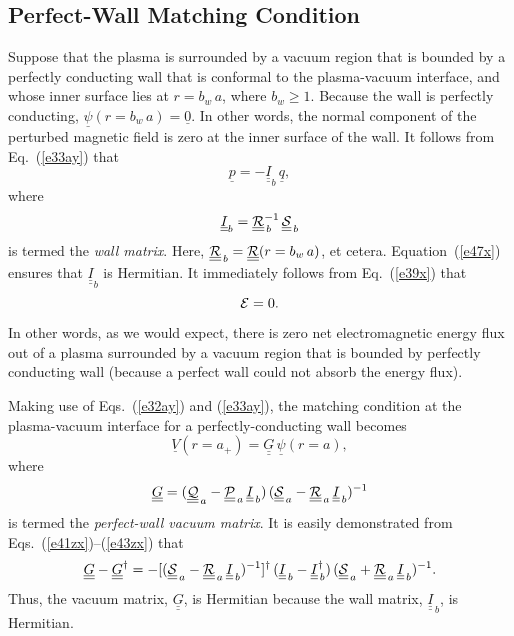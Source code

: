 \documentclass[12pt,prb,aps]{revtex4-1}
\begin{document}
\subsection{Perfect-Wall Matching Condition}
Suppose that the plasma is surrounded by a vacuum region that is bounded by a perfectly conducting wall that is conformal to the plasma-vacuum interface, and whose inner surface lies at $r=b_w\,a$, where $b_w\geq 1$. 
Because the wall is perfectly conducting, 
$\underline{\psi}(r=b_w\,a)=\underline{0}$.\cite{gs1}
In other words, the normal component of the perturbed magnetic field is zero at the inner surface of the wall. 
It follows from Eq.~(\ref{e33ay}) that
\begin{equation}
\underline{p} =- \underline{\underline{I}}_b\,\underline{q},
\end{equation}
where
\begin{equation}
 \underline{\underline{I}}_b= \underline{\underline{\cal R}}_{\,b}^{-1}\,\underline{\underline{\cal S}}_{\,b}
 \end{equation}
 is termed the {\em wall matrix}.
 Here, $\underline{\underline{\cal R}}_{\,b}= \underline{\underline{\cal R}}(r=b_w\,a)$, et cetera. Equation~(\ref{e47x}) ensures that $ \underline{\underline{I}}_b$
 is Hermitian. It immediately follows from Eq.~(\ref{e39x}) that
 \begin{equation}\label{ezero1}
 {\cal E}=0.
 \end{equation}
  In other words, as we would expect, there is zero net electromagnetic energy flux out of  a plasma
 surrounded by a vacuum region that is bounded by perfectly conducting wall (because a perfect wall could not absorb the energy flux). 
 
  Making use of Eqs.~(\ref{e32ay}) and (\ref{e33ay}),  the matching condition at the plasma-vacuum interface  for a perfectly-conducting wall becomes 
 \begin{equation}\label{gdef}
 \underline{V}(r=a_+)= \underline{\underline{G}}\,\underline{\psi}(r=a),
 \end{equation}
 where 
 \begin{equation}
 \underline{\underline{G}}= (\underline{\underline{\cal Q}}_{\,a}-\underline{\underline{\cal P}}_{\,a}\,\underline{\underline{I}}_{\,b})\,(\underline{\underline{\cal S}}_{\,a}-\underline{\underline{\cal R}}_{\,a}\,\underline{\underline{I}}_{\,b})^{-1}
 \end{equation}
 is termed the {\em perfect-wall vacuum matrix}.
It is easily demonstrated from  Eqs.~(\ref{e41zx})--(\ref{e43zx})  that
 \begin{equation}\label{e53xx}
 \underline{\underline{G}}-\underline{\underline{G}}^\dag =- [(\underline{\underline{\cal S}}_{\,a}-\underline{\underline{\cal R}}_{\,a}\,\underline{\underline{I}}_{\,b})^{-1}]^{\dag}\,(\underline{\underline{I}}_{\,b} -\underline{\underline{I}}^\dag_{\,b})\,  (\underline{\underline{\cal S}}_{\,a}+\underline{\underline{\cal R}}_{\,a}\,\underline{\underline{I}}_{\,b})^{-1}.
\end{equation}
Thus,  the vacuum matrix, $\underline{\underline{G}}$, is Hermitian because  the wall matrix, $\underline{\underline{I}}_{\,b}$, is Hermitian. 
 
\end{document}
